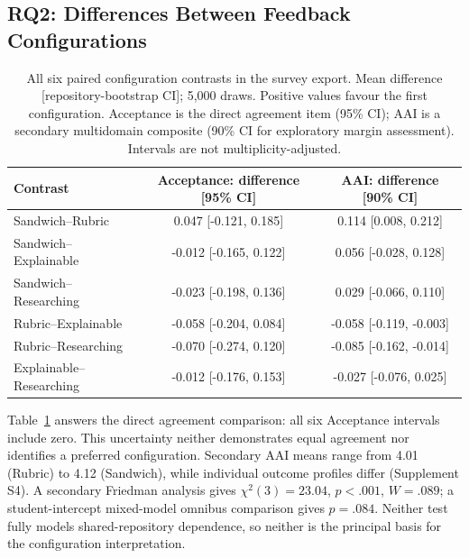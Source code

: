 \documentclass[runningheads]{llncs}
\begin{document}
\subsection{RQ2: Differences Between Feedback Configurations}

\begin{table}[t]
\caption{All six paired configuration contrasts in the survey export. Mean difference [repository-bootstrap CI]; 5,000 draws. Positive values favour the first configuration. Acceptance is the direct agreement item (95\% CI); AAI is a secondary multidomain composite (90\% CI for exploratory margin assessment). Intervals are not multiplicity-adjusted.}
\label{tab:rq2}
\centering\scriptsize
\setlength\tabcolsep{3pt}
\begin{tabular}{@{}lcc@{}}
\toprule
Contrast & Acceptance: difference [95\% CI] & AAI: difference [90\% CI] \\
\midrule
Sandwich--Rubric & 0.047 [-0.121, 0.185] & 0.114 [0.008, 0.212] \\
Sandwich--Explainable & -0.012 [-0.165, 0.122] & 0.056 [-0.028, 0.128] \\
Sandwich--Researching & -0.023 [-0.198, 0.136] & 0.029 [-0.066, 0.110] \\
Rubric--Explainable & -0.058 [-0.204, 0.084] & -0.058 [-0.119, -0.003] \\
Rubric--Researching & -0.070 [-0.274, 0.120] & -0.085 [-0.162, -0.014] \\
Explainable--Researching & -0.012 [-0.176, 0.153] & -0.027 [-0.076, 0.025] \\
\bottomrule
\end{tabular}
\end{table}

Table~\ref{tab:rq2} answers the direct agreement comparison: all six Acceptance intervals include zero. This uncertainty neither demonstrates equal agreement nor identifies a preferred configuration. Secondary AAI means range from 4.01 (Rubric) to 4.12 (Sandwich), while individual outcome profiles differ (Supplement S4). A secondary Friedman analysis gives $\chi^2(3)=23.04$, $p<.001$, $W=.089$; a student-intercept mixed-model omnibus comparison gives $p=.084$. Neither test fully models shared-repository dependence, so neither is the principal basis for the configuration interpretation.
\end{document}
